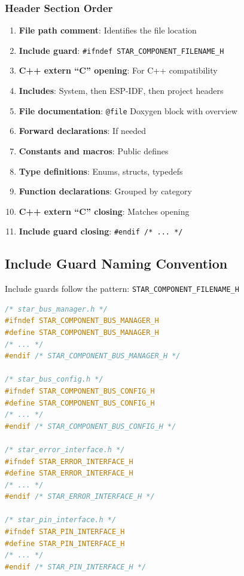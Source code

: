 \subsubsection{Header Section Order}

\begin{enumerate}
    \item \textbf{File path comment}: Identifies the file location
    \item \textbf{Include guard}: \texttt{\#ifndef STAR\_COMPONENT\_FILENAME\_H}
    \item \textbf{C++ extern ``C'' opening}: For C++ compatibility
    \item \textbf{Includes}: System, then ESP-IDF, then project headers
    \item \textbf{File documentation}: \texttt{@file} Doxygen block with overview
    \item \textbf{Forward declarations}: If needed
    \item \textbf{Constants and macros}: Public defines
    \item \textbf{Type definitions}: Enums, structs, typedefs
    \item \textbf{Function declarations}: Grouped by category
    \item \textbf{C++ extern ``C'' closing}: Matches opening
    \item \textbf{Include guard closing}: \texttt{\#endif /* ... */}
\end{enumerate}

\subsection{Include Guard Naming Convention}

Include guards follow the pattern: \texttt{STAR\_COMPONENT\_FILENAME\_H}

\begin{lstlisting}[language=C]
/* star_bus_manager.h */
#ifndef STAR_COMPONENT_BUS_MANAGER_H
#define STAR_COMPONENT_BUS_MANAGER_H
/* ... */
#endif /* STAR_COMPONENT_BUS_MANAGER_H */

/* star_bus_config.h */
#ifndef STAR_COMPONENT_BUS_CONFIG_H
#define STAR_COMPONENT_BUS_CONFIG_H
/* ... */
#endif /* STAR_COMPONENT_BUS_CONFIG_H */

/* star_error_interface.h */
#ifndef STAR_ERROR_INTERFACE_H
#define STAR_ERROR_INTERFACE_H
/* ... */
#endif /* STAR_ERROR_INTERFACE_H */

/* star_pin_interface.h */
#ifndef STAR_PIN_INTERFACE_H
#define STAR_PIN_INTERFACE_H
/* ... */
#endif /* STAR_PIN_INTERFACE_H */
\end{lstlisting}

